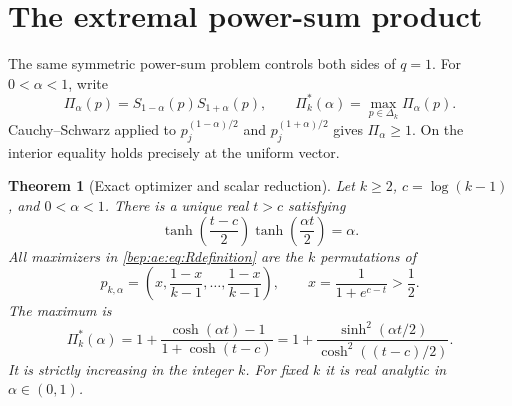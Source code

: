 \documentclass[11pt]{article}
\numberwithin{equation}{section}
\newtheorem{theorem}{Theorem}[section]
\theoremstyle{definition}
\theoremstyle{remark}
\begin{document}
\section{The extremal power-sum product}\label{bep:ae:sec:extremal}
The same symmetric power-sum problem controls both sides of $q=1$.
For $0<\alpha<1$, write
\begin{equation}\label{bep:ae:eq:Rdefinition}
 \Pi_\alpha(p)=S_{1-\alpha}(p)S_{1+\alpha}(p),\qquad
 \Pi^{*}_k(\alpha)=\max_{p\in\Delta_k}\Pi_\alpha(p).
\end{equation}
Cauchy--Schwarz applied to
$p_j^{(1-\alpha)/2}$ and $p_j^{(1+\alpha)/2}$ gives $\Pi_\alpha\geq1$.
On the interior equality holds precisely at the uniform vector.

\begin{theorem}[Exact optimizer and scalar reduction]\label{bep:ae:thm:extremal}
Let $k\geq2$, $c=\log(k-1)$, and $0<\alpha<1$. There is a unique real
$t>c$ satisfying
\begin{equation}\label{bep:ae:eq:critical}
 \tanh\!\left(\frac{t-c}{2}\right)
 \tanh\!\left(\frac{\alpha t}{2}\right)=\alpha.
\end{equation}
All maximizers in \eqref{bep:ae:eq:Rdefinition} are the $k$ permutations of
\begin{equation}\label{bep:ae:eq:maxdistribution}
 p_{k,\alpha}=\left(x,\frac{1-x}{k-1},\ldots,
                   \frac{1-x}{k-1}\right),\qquad
 x=\frac1{1+e^{c-t}}>\frac12.
\end{equation}
The maximum is
\begin{equation}\label{bep:ae:eq:Rformula}
 \Pi^{*}_k(\alpha)
 =1+\frac{\cosh(\alpha t)-1}{1+\cosh(t-c)}
 =1+\frac{\sinh^2(\alpha t/2)}{\cosh^2((t-c)/2)}.
\end{equation}
It is strictly increasing in the integer $k$. For fixed $k$ it is real
analytic in $\alpha\in(0,1)$.
\end{theorem}
\end{document}
